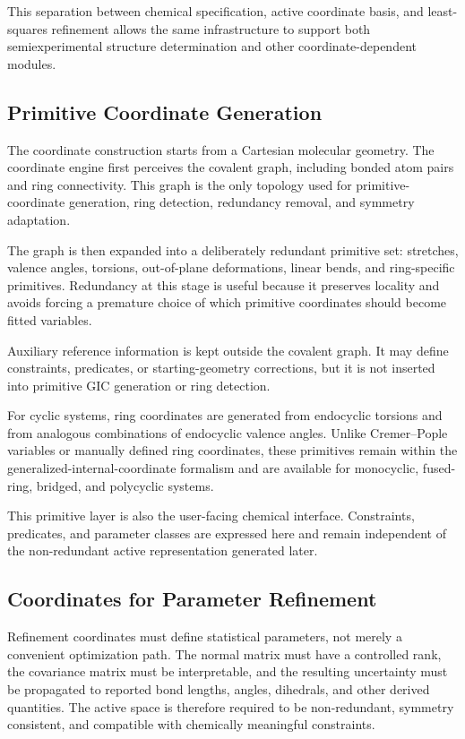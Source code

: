 \documentclass[journal=jctcce,manuscript=article,maxauthors=999]{achemso}
\begin{document}
This separation between chemical specification, active coordinate basis, and
least-squares refinement allows the same infrastructure to support both
semiexperimental structure determination and other coordinate-dependent
modules.


\subsection{Primitive Coordinate Generation}

The coordinate construction starts from a Cartesian molecular geometry.
The coordinate engine first perceives the covalent graph, including bonded atom
pairs and ring connectivity. This graph is the only topology used for
primitive-coordinate generation, ring detection, redundancy removal, and
symmetry adaptation.

The graph is then expanded into a deliberately redundant primitive set:
stretches, valence angles, torsions, out-of-plane deformations, linear bends,
and ring-specific primitives. Redundancy at this stage is useful because it
preserves locality and avoids forcing a premature choice of which primitive
coordinates should become fitted variables.

Auxiliary reference information is kept outside the covalent graph. It may
define constraints, predicates, or starting-geometry corrections, but it is not
inserted into primitive GIC generation or ring detection.

For cyclic systems, ring coordinates are generated from endocyclic torsions and
from analogous combinations of endocyclic valence angles. Unlike
Cremer--Pople variables\cite{CremerPople1975} or manually defined ring
coordinates, these primitives remain within the generalized-internal-coordinate
formalism and are available for monocyclic, fused-ring, bridged, and
polycyclic systems.

This primitive layer is also the user-facing chemical interface. Constraints,
predicates, and parameter classes are expressed here and remain independent of
the non-redundant active representation generated later.


\subsection{Coordinates for Parameter Refinement}

Refinement coordinates must define statistical parameters, not merely a
convenient optimization path. The normal matrix must have a controlled rank,
the covariance matrix must be interpretable, and the resulting uncertainty
must be propagated to reported bond lengths, angles, dihedrals, and other
derived quantities. The active space is therefore required to be
non-redundant, symmetry consistent, and compatible with chemically meaningful
constraints.
\end{document}
